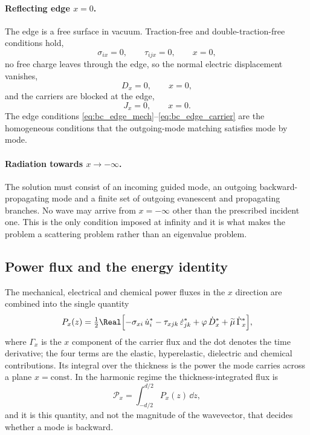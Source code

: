 \paragraph{Reflecting edge $x=0$.}
The edge is a free surface in vacuum.  Traction-free and double-traction-free
conditions hold,
\begin{equation}
\label{eq:bc_edge_mech}
\sigma_{ix}=0,\qquad \tau_{ijx}=0,\qquad x=0,
\end{equation}
no free charge leaves through the edge, so the normal electric displacement
vanishes,
\begin{equation}
\label{eq:bc_edge_elec}
D_x=0,\qquad x=0,
\end{equation}
and the carriers are blocked at the edge,
\begin{equation}
\label{eq:bc_edge_carrier}
J_x=0,\qquad x=0 .
\end{equation}
The edge conditions \eqref{eq:bc_edge_mech}--\eqref{eq:bc_edge_carrier} are the
homogeneous conditions that the outgoing-mode matching satisfies mode by mode.

\paragraph{Radiation towards $x\to-\infty$.}
The solution must consist of an incoming guided mode, an outgoing
backward-propagating mode and a finite set of outgoing evanescent and
propagating branches.  No wave may arrive from $x=-\infty$ other than the
prescribed incident one.  This is the only condition imposed at infinity and it
is what makes the problem a scattering problem rather than an eigenvalue
problem.

\subsection{Power flux and the energy identity}
\label{sec:governing_energy}

The mechanical, electrical and chemical power fluxes in the $x$ direction are
combined into the single quantity
\begin{equation}
\label{eq:powerflux}
P_x(z)=\tfrac12\Real\Bigl[-\sigma_{xi}\,\dot u_i^{*}
-\tau_{xjk}\,\dot\varepsilon_{jk}^{*}
+\varphi\,\dot D_x^{*}
+\widetilde\mu\,\dot\Gamma_x^{*}\Bigr],
\end{equation}
where $\Gamma_x$ is the $x$ component of the carrier flux and the dot denotes
the time derivative; the four terms are the elastic, hyperelastic, dielectric
and chemical contributions.  Its integral over the thickness is the power the
mode carries across a plane $x=\text{const}$.  In the harmonic regime the
thickness-integrated flux is
\begin{equation}
\label{eq:Px_int}
\mathcal{P}_x=\int_{-d/2}^{d/2}P_x(z)\,\dd z ,
\end{equation}
and it is this quantity, and not the magnitude of the wavevector, that decides
whether a mode is backward.

